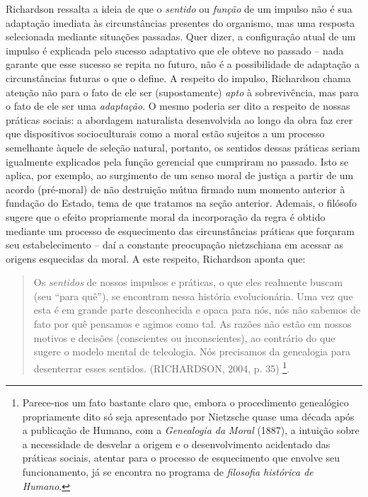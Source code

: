 \documentclass[
	12pt,				%
	openright,			%
	oneside,			%
	a4paper,			%
	english,			%
	french,				%
	spanish,			%
	brazil				%
	]{abntex2}
\begin{document}
Richardson ressalta a ideia de que o \textit{sentido} ou \textit{função} de um impulso não é sua adaptação imediata às circunstâncias presentes do organismo, mas uma resposta selecionada mediante situações passadas. Quer dizer, a configuração atual de um impulso é explicada pelo sucesso adaptativo que ele obteve no passado – nada garante que esse sucesso se repita no futuro, não é a possibilidade de adaptação a circunstâncias futuras o que o define. A respeito do impulso, Richardson chama atenção não para o fato de ele ser (supostamente) \textit{apto }à sobrevivência, mas para o fato de ele ser uma \textit{adaptação}. O mesmo poderia ser dito a respeito de nossas práticas sociais: a abordagem naturalista desenvolvida ao longo da obra faz crer que dispositivos socioculturais como a moral estão sujeitos a um processo semelhante àquele de seleção natural, portanto, os sentidos dessas práticas seriam igualmente explicados pela função gerencial que cumpriram no passado. Isto se aplica, por exemplo, ao surgimento de um senso moral de justiça a partir de um acordo (pré-moral) de não destruição mútua firmado num momento anterior à fundação do Estado, tema de que tratamos na seção anterior. Ademais, o filósofo sugere que o efeito propriamente moral da incorporação da regra é obtido mediante um processo de esquecimento das circunstâncias práticas que forçaram seu estabelecimento – daí a constante preocupação nietzschiana em acessar as origens esquecidas da moral. A este respeito, Richardson aponta que:

\begin{quotation}
Os \textit{sentidos} de nossos impulsos e práticas, o que eles realmente buscam (seu “para quê”), se encontram nessa história evolucionária. Uma vez que esta é em grande parte desconhecida e opaca para nós, nós não sabemos de fato por quê pensamos e agimos como tal. As razões não estão em nossos motivos e decisões (conscientes ou inconscientes), ao contrário do que sugere o modelo mental de teleologia. Nós precisamos da genealogia para desenterrar esses sentidos. (RICHARDSON, 2004, p. 35)
\footnote{Parece-nos um fato bastante claro que, embora o procedimento genealógico propriamente dito só seja apresentado por Nietzsche quase uma década após a publicação de Humano, com a \textit{Genealogia da Moral} (1887), a intuição sobre a necessidade de desvelar a origem e o desenvolvimento acidentado das práticas sociais, atentar para o processo de esquecimento que envolve seu funcionamento, já se encontra no programa de \textit{filosofia histórica de Humano}.}.
\end{quotation}
\end{document}
